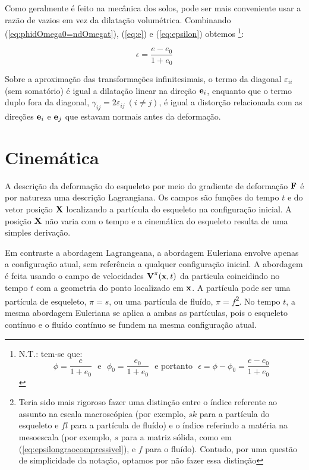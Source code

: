 \documentclass[
	11pt, %
	fleqn, %
	a4paper, %
]{LegrandOrangeBook}
\begin{document}
Como geralmente é feito na mecânica dos solos, pode ser mais conveniente usar a razão de vazios em vez da dilatação volumétrica. Combinando (\ref{eq:phidOmega0=ndOmegat}), (\ref{eq:e}) e (\ref{eq:epsilon}) obtemos \footnote{N.T.: tem-se que:
	\begin{displaymath}	
		\phi = \dfrac{e}{1+e_0} ~~~ \text{e} ~~~ \phi_0 = \dfrac{e_0}{1+e_0} ~~~ \text{e portanto}  ~~~ \epsilon = \phi - \phi_0 = \dfrac{e-e_0}{1+e_0}
	\end{displaymath}
}:

\begin{equation}
	\label{eq:epsilon}	
	\epsilon = \dfrac{e-e_0}{1+e_0}
\end{equation}

Sobre a aproximação das transformações infinitesimais, o termo da diagonal $\varepsilon_{ii}$ (sem somatório) é igual a dilatação linear na direção $\textbf{e}_i$, enquanto que o termo duplo fora da diagonal, $\gamma_{ij}=2\varepsilon_{ij}~(i\neq j)$, é igual a distorção relacionada com as direções $\textbf{e}_i$ e $\textbf{e}_j$ que estavam normais antes da deformação.


\section{Cinemática}

A descrição da deformação do esqueleto por meio do gradiente de deformação $\textbf{F}$ é por natureza uma descrição Lagrangiana. Os campos são funções do tempo $t$ e do vetor posição $\textbf{X}$ localizando a partícula do esqueleto na configuração inicial. A posição $\textbf{X}$ não varia com o tempo e a cinemática do esqueleto resulta de uma simples derivação.

Em contraste a abordagem Lagrangeana, a abordagem Euleriana envolve apenas a configuração atual, sem referência a qualquer configuração inicial. A abordagem é feita usando o campo de velocidades $\textbf{V}^\pi(\textbf{x},t)$ da particula coincidindo no tempo $t$ com a geometria do ponto localizado em $\textbf{x}$. A partícula pode ser uma partícula de esqueleto, $\pi = s$, ou uma partícula de fluído, $\pi = f$\footnote{Teria sido mais rigoroso fazer uma distinção entre o índice referente ao assunto na escala macroscópica (por exemplo, $sk$ para a partícula do esqueleto e $fl$ para a partícula de fluído) e o índice referindo a matéria na mesoescala (por exemplo, $s$ para a matriz sólida, como em (\ref{eq:epsilongraocompressivel}), e $f$ para o fluído). Contudo, por uma questão de simplicidade da notação, optamos por não fazer essa distinção}. No tempo $t$, a mesma abordagem Euleriana se aplica a ambas as partículas, pois o esqueleto contínuo e o fluído contínuo se fundem na mesma configuração atual.
\end{document}
